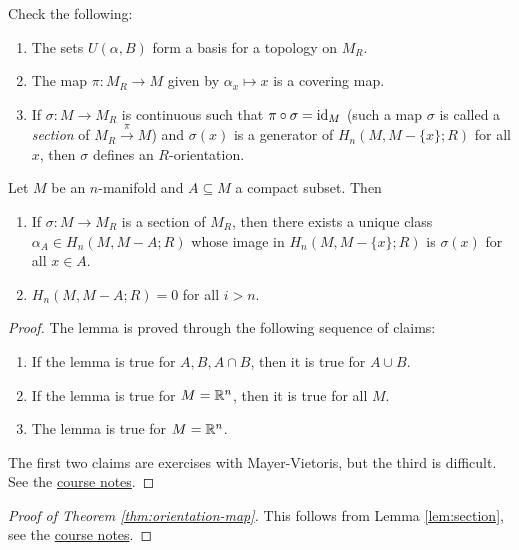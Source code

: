\begin{exercise}
  Check the following:
  \begin{enumerate}
    \item The sets $U(\alpha, B)$ form a
      basis for a topology on $M_R$.
    \item The map $\pi : M_R \to M$ given by
      $\alpha_x \mapsto x$ is a covering map.
    \item If $\sigma : M \to M_R$ is
      continuous such that $\pi \circ \sigma = \operatorname{id}_M$
      (such a map $\sigma$ is called a
      \emph{section} of $M_R \overset{\pi}{\to} M$)
      and $\sigma(x)$ is a generator of
      $H_n(M, M - \{x\}; R)$ for all
      $x$, then $\sigma$ defines an $R$-orientation.
  \end{enumerate}
\end{exercise}

\begin{lemma}\label{lem:section}
  Let $M$ be an $n$-manifold and $A \subseteq M$
  a compact subset. Then
  \begin{enumerate}
    \item If $\sigma : M \to M_R$ is a
      section of $M_R$, then there exists a
      unique class $\alpha_A \in H_n(M, M - A; R)$
      whose image in $H_n(M, M - \{x\}; R)$ is $\sigma(x)$
      for all $x \in A$.
    \item $H_n(M, M - A; R) = 0$ for all
      $i > n$.
  \end{enumerate}
\end{lemma}

\begin{proof}
  The lemma is proved through the following
  sequence of claims:
  \begin{enumerate}
    \item If the lemma is true for $A, B, A \cap B$, then
      it is true for $A \cup B$.
    \item If the lemma is true for $M = \mathbb{R}^n$,
      then it is true for all $M$.
    \item The lemma is true for $M = \mathbb{R}^n$.
  \end{enumerate}
  The first two claims are exercises with
  Mayer-Vietoris, but the third is
  difficult.
  See the \href{https://etnyre.math.gatech.edu/class/6441Spring21/SectionIV.pdf}{course notes}.
\end{proof}

\begin{proof}[Proof of Theorem \ref{thm:orientation-map}]
  This follows from Lemma \ref{lem:section},
  see the \href{https://etnyre.math.gatech.edu/class/6441Spring21/SectionIV.pdf}{course notes}.
\end{proof}

